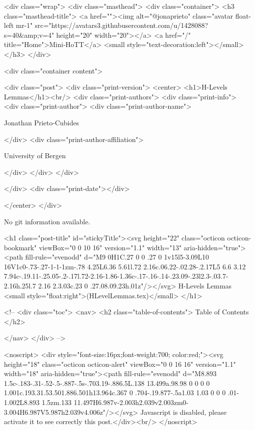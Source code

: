     <div class="wrap">
      <div class="masthead">
        <div class="container">
          <h3 class="masthead-title">
            <a href=""><img alt="@jonaprieto" class="avatar float-left mr-1" src="https://avatars3.githubusercontent.com/u/1428088?s=40&amp;v=4" height="20" width="20"></a>
            <a href="/" title="Home">Mini-HoTT</a>
            <small style="text-decoration:left"></small>
          </h3>
        </div>
      
      <div class="container content">
        







<div class="post">
  <div class="print-version">
    <center>
      <h1>H-Levels Lemmas</h1><br/>
        <div class="print-authors">
          <div class="print-info">
            <div class="print-author">
              <div class="print-author-name">
                
                  Jonathan Prieto-Cubides
                
              </div>
              <div class="print-author-affiliation">
                
                  University of Bergen
                
                </div>
            </div>
          </div>
          
          
        </div>
        <div class="print-date"></div>
        
        
    </center>
  </div>

  
  No git information available.
  

  <h1 class="post-title" id="stickyTitle"><svg height="22" class="octicon octicon-bookmark" viewBox="0 0 10 16" version="1.1" width="13" aria-hidden="true"><path fill-rule="evenodd" d="M9 0H1C.27 0 0 .27 0 1v15l5-3.09L10 16V1c0-.73-.27-1-1-1zm-.78 4.25L6.36 5.61l.72 2.16c.06.22-.02.28-.2.17L5 6.6 3.12 7.94c-.19.11-.25.05-.2-.17l.72-2.16-1.86-1.36c-.17-.16-.14-.23.09-.23l2.3-.03.7-2.16h.25l.7 2.16 2.3.03c.23 0 .27.08.09.23h.01z"/></svg> H-Levels Lemmas <small style="float:right">(HLevelLemmas.tex)</small>
  </h1>

  <!-- 
  <div class="toc">
    <nav>
    <h2 class="table-of-contents"> Table of Contents </h2>
      

    </nav>
  </div>
   -->

  <noscript>
  <div style="font-size:16px;font-weight:700; color:red;"><svg height="18" class="octicon octicon-alert" viewBox="0 0 16 16" version="1.1" width="18" aria-hidden="true"><path fill-rule="evenodd" d="M8.893 1.5c-.183-.31-.52-.5-.887-.5s-.703.19-.886.5L.138 13.499a.98.98 0 0 0 0 1.001c.193.31.53.501.886.501h13.964c.367 0 .704-.19.877-.5a1.03 1.03 0 0 0 .01-1.002L8.893 1.5zm.133 11.497H6.987v-2.003h2.039v2.003zm0-3.004H6.987V5.987h2.039v4.006z"/></svg> Javascript is disabled, please activate it to see correctly this post.</div><br/>
  </noscript>

